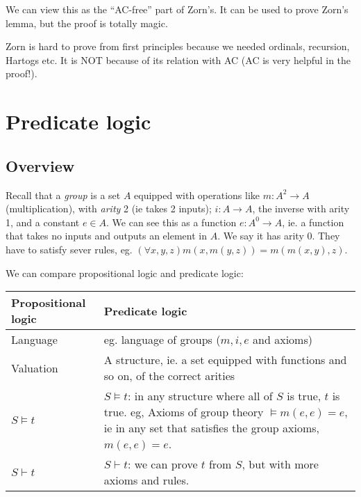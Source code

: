 \documentclass[a4paper]{article}
\begin{document}
We can view this as the ``AC-free'' part of Zorn's. It can be used to prove Zorn's lemma, but the proof is totally magic.

\note Zorn is hard to prove from first principles because we needed ordinals, recursion, Hartogs etc. It is NOT because of its relation with AC (AC is very helpful in the proof!).

\section{Predicate logic}
\subsection{Overview}
Recall that a \emph{group} is a set $A$ equipped with operations like $m: A^2\to A$ (multiplication), with \emph{arity} 2 (ie takes 2 inputs); $i: A\to A$, the inverse with arity 1, and a constant $e\in A$. We can see this as a function $e: A^0 \to A$, ie. a function that takes no inputs and outputs an element in $A$. We say it has arity 0. They have to satisfy sever rules, eg. $(\forall x, y, z) m(x, m(y, z)) = m(m(x, y), z)$.

We can compare propositional logic and predicate logic:

\noindent\begin{tabular}{p{}p{}}
  \toprule
  Propositional logic & Predicate logic\\
  \midrule
  Language & eg. language of groups ($m, i, e$ and axioms)\\
  Valuation & A structure, ie. a set equipped with functions and so on, of the correct arities\\
  $S\models t$ & $S\models t$: in any structure where all of $S$ is true, $t$ is true. eg, Axioms of group theory $\models m(e, e) = e$, ie in any set that satisfies the group axioms, $m(e, e) = e$.\\
  $S\vdash t$ & $S\vdash t$: we can prove $t$ from $S$, but with more axioms and rules.\\
  \bottomrule
\end{tabular}
\end{document}
